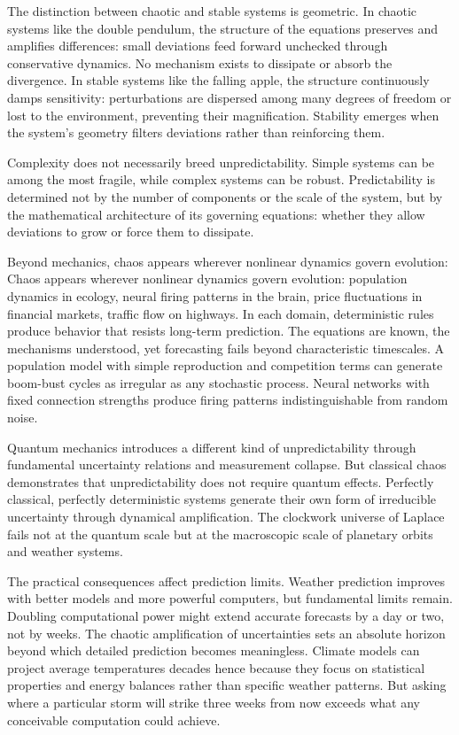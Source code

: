 The distinction between chaotic and stable systems is geometric. In chaotic systems like the double pendulum, the structure of the equations preserves and amplifies differences: small deviations feed forward unchecked through conservative dynamics. No mechanism exists to dissipate or absorb the divergence. In stable systems like the falling apple, the structure continuously damps sensitivity: perturbations are dispersed among many degrees of freedom or lost to the environment, preventing their magnification. Stability emerges when the system’s geometry filters deviations rather than reinforcing them.

Complexity does not necessarily breed unpredictability. Simple systems can be among the most fragile, while complex systems can be robust. Predictability is determined not by the number of components or the scale of the system, but by the mathematical architecture of its governing equations: whether they allow deviations to grow or force them to dissipate.

Beyond mechanics, chaos appears wherever nonlinear dynamics govern evolution: Chaos appears wherever nonlinear dynamics govern evolution: population dynamics in ecology, neural firing patterns in the brain, price fluctuations in financial markets, traffic flow on highways. In each domain, deterministic rules produce behavior that resists long-term prediction. The equations are known, the mechanisms understood, yet forecasting fails beyond characteristic timescales. A population model with simple reproduction and competition terms can generate boom-bust cycles as irregular as any stochastic process. Neural networks with fixed connection strengths produce firing patterns indistinguishable from random noise.

Quantum mechanics introduces a different kind of unpredictability through fundamental uncertainty relations and measurement collapse. But classical chaos demonstrates that unpredictability does not require quantum effects. Perfectly classical, perfectly deterministic systems generate their own form of irreducible uncertainty through dynamical amplification. The clockwork universe of Laplace fails not at the quantum scale but at the macroscopic scale of planetary orbits and weather systems.

The practical consequences affect prediction limits. Weather prediction improves with better models and more powerful computers, but fundamental limits remain. Doubling computational power might extend accurate forecasts by a day or two, not by weeks. The chaotic amplification of uncertainties sets an absolute horizon beyond which detailed prediction becomes meaningless. Climate models can project average temperatures decades hence because they focus on statistical properties and energy balances rather than specific weather patterns. But asking where a particular storm will strike three weeks from now exceeds what any conceivable computation could achieve.

